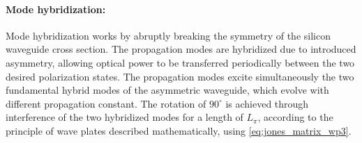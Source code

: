 \documentclass[../report.tex]{subfiles}
\begin{document}
			\paragraph*{Mode hybridization:}
Mode hybridization works by abruptly breaking the symmetry of the silicon waveguide cross section. The propagation modes are hybridized due to introduced asymmetry, allowing optical power to be transferred periodically between the two desired polarization states. The propagation modes excite simultaneously the two fundamental hybrid modes of the asymmetric waveguide, which evolve with different propagation constant. The rotation of $90^{\circ}$ is achieved through interference of the two hybridized modes for a length of $L_{\pi}$, according to the principle of wave plates described mathematically, using \ref{eq:jones_matrix_wp3}. 
\end{document}
